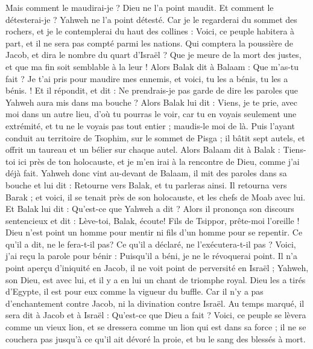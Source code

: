 \begin{multicols}{2}
Mais comment le maudirai-je ? Dieu ne l'a point maudit. Et comment le détesterai-je ? Yahweh ne l'a point détesté.
Car je le regarderai du sommet des rochers, et je le contemplerai du haut des collines : Voici, ce peuple habitera à part, et il ne sera pas compté parmi les nations.
Qui comptera la poussière de Jacob, et dira le nombre du quart d'Israël ? Que je meure de la mort des justes, et que ma fin soit semblable à la leur !
Alors Balak dit à Balaam : Que m'as-tu fait ? Je t'ai pris pour maudire mes ennemis, et voici, tu les a bénis, tu les a bénis. !
Et il répondit, et dit : Ne prendrais-je pas garde de dire les paroles que Yahweh aura mis dans ma bouche ?
Alors Balak lui dit : Viens, je te prie, avec moi dans un autre lieu, d'où tu pourras le voir, car tu en voyais seulement une extrémité, et tu ne le voyais pas tout entier ; maudis-le moi de là.
Puis l'ayant conduit au territoire de Tsophim, sur le sommet de Pisga ; il bâtit sept autels, et offrit un taureau et un bélier sur chaque autel.
Alors Balaam dit à Balak : Tiens-toi ici près de ton holocauste, et je m'en irai à la rencontre de Dieu, comme j'ai déjà fait.
Yahweh donc vint au-devant de Balaam, il mit des paroles dans sa bouche et lui dit : Retourne vers Balak, et tu parleras ainsi.
Il retourna vers Barak ; et voici, il se tenait près de son holocauste, et les chefs de Moab avec lui. Et Balak lui dit : Qu'est-ce que Yahweh a dit ?
Alors il prononça son discours sentencieux et dit : Lève-toi, Balak, écoute! Fils de Tsippor, prête-moi l'oreille !
Dieu n'est point un homme pour mentir ni fils d'un homme pour se repentir. Ce qu'il a dit, ne le fera-t-il pas? Ce qu'il a déclaré, ne l'exécutera-t-il pas ?
Voici, j'ai reçu la parole pour bénir : Puisqu'il a béni, je ne le révoquerai point.
Il n'a point aperçu d'iniquité en Jacob, il ne voit point de perversité en Israël ; Yahweh, son Dieu, est avec lui, et il y a en lui un chant de triomphe royal.
Dieu les a tirés d'Egypte, il est pour eux comme la vigueur du buffle.
 Car il n'y a pas d'enchantement contre Jacob, ni la divination contre Israël. Au temps marqué, il sera dit à Jacob et à Israël : Qu'est-ce que Dieu a fait ?
Voici, ce peuple se lèvera comme un vieux lion, et se dressera comme un lion qui est dans sa force ; il ne se couchera pas jusqu'à ce qu'il ait dévoré la proie, et bu le sang des blessés à mort.

\end{multicols}
